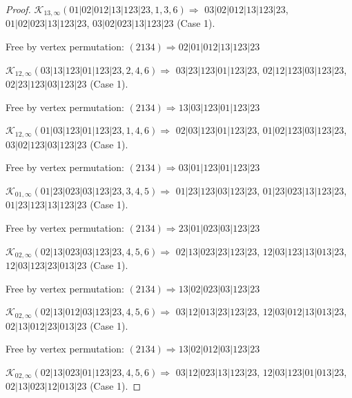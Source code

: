 \documentclass[12pt]{article}
\theoremstyle{plain}
\theoremstyle{definition}
\theoremstyle{remark}
\newcommand{\fancy}[1]{\mathcal{#1}}
\def\K{\fancy{K}}
\begin{document}
\begin{proof}
	\bigskip
	
	$\K_{13,\infty}(01|02|012|13|123|23,1, 3, 6)\Rightarrow $ $03|02|012|13|123|23$, $01|02|023|13|123|23$, $03|02|023|13|123|23$ (Case 1).
	
	
	
	Free by vertex permutation: $(2 1 3 4)\Rightarrow 02|01|012|13|123|23$
	
	
	\bigskip
	
	$\K_{12,\infty}(03|13|123|01|123|23,2, 4, 6)\Rightarrow $ $03|23|123|01|123|23$, $02|12|123|03|123|23$, $02|23|123|03|123|23$ (Case 1).
	
	
	
	Free by vertex permutation: $(2 1 3 4)\Rightarrow 13|03|123|01|123|23$
	
	
	\bigskip
	
	$\K_{12,\infty}(01|03|123|01|123|23,1, 4, 6)\Rightarrow $ $02|03|123|01|123|23$, $01|02|123|03|123|23$, $03|02|123|03|123|23$ (Case 1).
	
	
	
	Free by vertex permutation: $(2 1 3 4)\Rightarrow 03|01|123|01|123|23$
	
	
	\bigskip
	
	$\K_{01,\infty}(01|23|023|03|123|23,3, 4, 5)\Rightarrow $ $01|23|123|03|123|23$, $01|23|023|13|123|23$, $01|23|123|13|123|23$ (Case 1).
	
	
	
	Free by vertex permutation: $(2 1 3 4)\Rightarrow 23|01|023|03|123|23$
	
	
	\bigskip
	
	$\K_{02,\infty}(02|13|023|03|123|23,4, 5, 6)\Rightarrow $ $02|13|023|23|123|23$, $12|03|123|13|013|23$, $12|03|123|23|013|23$ (Case 1).
	
	
	
	Free by vertex permutation: $(2 1 3 4)\Rightarrow 13|02|023|03|123|23$
	
	
	\bigskip
	
	$\K_{02,\infty}(02|13|012|03|123|23,4, 5, 6)\Rightarrow $ $03|12|013|23|123|23$, $12|03|012|13|013|23$, $02|13|012|23|013|23$ (Case 1).
	
	
	
	Free by vertex permutation: $(2 1 3 4)\Rightarrow 13|02|012|03|123|23$
	
	
	\bigskip
	
	$\K_{02,\infty}(02|13|023|01|123|23,4, 5, 6)\Rightarrow $ $03|12|023|13|123|23$, $12|03|123|01|013|23$, $02|13|023|12|013|23$ (Case 1).
	
	
	

\end{proof}
\end{document}
